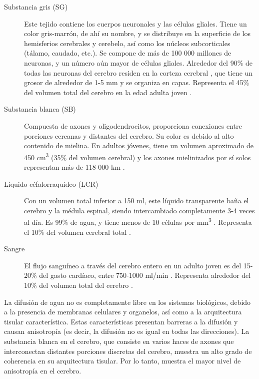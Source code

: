 \begin{description}
\item[Substancia gris (SG)] Este tejido contiene los cuerpos neuronales y las células gliales. Tiene un color gris-marrón, de ahí su nombre, y se distribuye en la superficie de los hemisferios cerebrales y cerebelo, así como los núcleos subcorticales (tálamo, caudado, etc.). Se compone de más de 100 000 millones de neuronas, y un número aún mayor de células gliales. Alrededor del 90\% de todas las neuronas del cerebro residen en la corteza cerebral \cite{Pakkenberg_1997}, que tiene un grosor de alrededor de 1-5 mm y se organiza en capas. Representa el 45\% del volumen total del cerebro en la edad adulta joven \cite{Rengachary_2004}.
\item[Substancia blanca (SB)] Compuesta de axones y oligodendrocitos, proporciona conexiones entre porciones cercanas y distantes del cerebro. Su color es debido al alto contenido de mielina. En adultos jóvenes, tiene un volumen aproximado de 450 cm\textsuperscript{3} (35\% del volumen cerebral) y los axones mielinizados por sí solos representan más de 118 000 km \cite{Tang_1997}.
\item[Líquido céfalorraquídeo (LCR)] Con un volumen total inferior a 150 ml, este líquido transparente baña el cerebro y la médula espinal, siendo intercambiado completamente 3-4 veces al día. Es 99\% de agua, y tiene menos de 10 células por mm\textsuperscript{3} \cite{Kandel_2000}. Representa el 10\% del volumen cerebral total \cite{Rengachary_2004}.
\item[Sangre] El flujo sanguíneo a través del cerebro entero en un adulto joven es del 15-20\% del gasto cardíaco, entre 750-1000 ml/min \cite{Kandel_2000}. Representa alrededor del 10\% del volumen total del cerebro \cite{Rengachary_2004}.
\end{description}

La difusión de agua no es completamente libre en los sistemas biológicos, debido a la presencia de membranas celulares y organelos, así como a la arquitectura tisular característica. Estas características presentan barreras a la difusión y causan {\emph anisotropía} (es decir, la difusión no es igual en todas las direcciones). La substancia blanca en el cerebro, que consiste en varios haces de axones que interconectan distantes porciones discretas del cerebro, muestra un alto grado de coherencia en su arquitectura tisular. Por lo tanto, muestra el mayor nivel de anisotropía en el cerebro.

